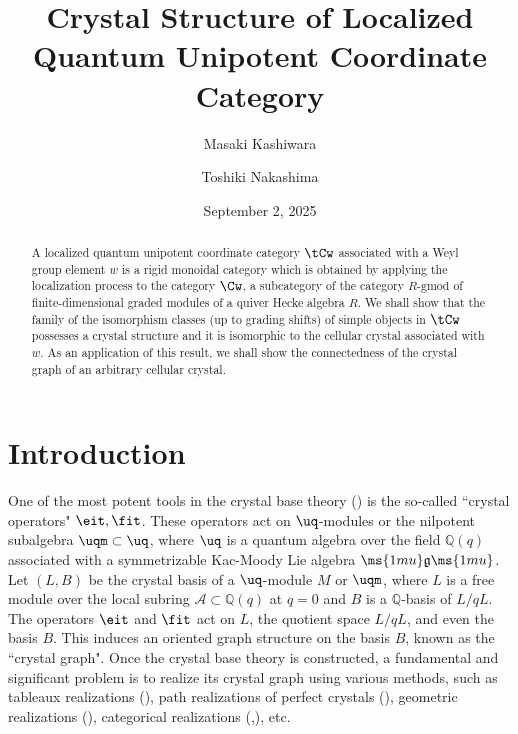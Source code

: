 \documentclass[12pt,leqno]{amsart}%
\title[Crystal structure on Localized category]%
{Crystal Structure of Localized Quantum Unipotent Coordinate Category}
\author[M. Kashiwara]{Masaki Kashiwara}
\author[T. Nakashima]{Toshiki Nakashima}
\date{September 2, 2025}
\theoremstyle{plain}
\theoremstyle{definition}
\newcommand{\Q}{\mathbb {Q}}
\newcommand{\g}{\ms{1mu}\mathfrak{g}\ms{1mu}}
\newcommand{\gmod}{\text{-}\mathrm{gmod}}
\newcommand{\cA}{{\mathcal A}}
\numberwithin{equation}{section}
\begin{document}
\maketitle

\begin{abstract}
A localized quantum unipotent
coordinate category $\tCw$
 associated with a Weyl group element $w$
 is a rigid monoidal category which is obtained by applying  the localization process 
to the category $\Cw$, a subcategory of the category $R\gmod$ of 
 finite-dimensional graded modules of a quiver Hecke algebra $R$.
We shall show that the family of the isomorphism classes (up to grading shifts) of  
simple objects in $\tCw$ possesses a
crystal structure and it is isomorphic 
to the cellular crystal associated with $w$. As an application of this result, 
we shall show the connectedness of the crystal graph of an arbitrary cellular crystal. 
\end{abstract}


\tableofcontents

\section{Introduction}


One of the most potent tools in the crystal base theory (\cite{K1}) is 
the so-called ``crystal operators" $\eit, \fit$. These operators
 act on $\uq$-modules or the nilpotent subalgebra $\uqm\subset \uq$, 
where $\uq$ is a quantum algebra over the field $\Q(q)$ associated with 
a symmetrizable Kac-Moody Lie algebra $\g$. 
Let $(L,B)$ be the crystal basis of a $\uq$-module $M$ or $\uqm$, 
where $L$ is a free module over the local subring $\cA\subset\Q(q)$ at $q=0$ and $B$ is a $\Q$-basis of $L/qL$. 
The operators $\eit$ and $\fit$ act on $L$, 
the quotient space $L/qL$, and even the basis $B$. 
This induces an oriented graph structure on the basis $B$, 
known as the ``crystal graph". 
Once the crystal base theory is constructed, 
a fundamental and significant problem is to realize its crystal graph using various methods, 
such as tableaux realizations (\cite{KN}), path realizations of perfect crystals
(\cite{KMN1,KMN2}), geometric realizations (\cite{K-Saito}), 
categorical realizations (\cite{LV11},\cite{N2}), etc.
\end{document}
